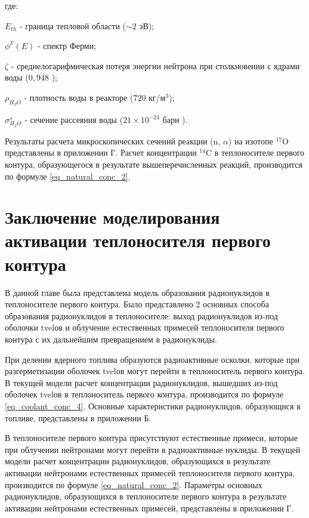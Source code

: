 где:
\begin{description}
    \item $E_{th}$ - граница тепловой области ($\sim 2$ эВ);
    \item $\phi^F(E)$ - спектр Ферми;
    \item $\zeta$ - среднелогарифмическая потеря энергии нейтрона при столкновении с ядрами воды ($0,948$ 
        \cite{savander_part1});
    \item $\rho_{H_2O}$ - плотность воды в реакторе ($720$ кг/м$^{3}$);
    \item $\sigma_{H_2O}^s$ - сечение рассеяния воды ($21 \times 10^{-24}$ барн \cite{janis}).
\end{description}

Результаты расчета микроскопических сечений реакции (n, $\alpha$) на изотопе $^{17}\text{O}$ представлены в приложении 
Г. Расчет концентрации $^{14}\text{C}$ в теплоносителе первого контура, образующегося в результате вышеперечисленных 
реакций, производится по формуле \ref{eq_natural_conc_2}.

\section{Заключение моделирования активации теплоносителя первого контура}

В данной главе была представлена модель образования радионуклидов в теплоносителе первого контура. Было представлено 2 
основных способа образования радионуклидов в теплоносителе: выход радионуклидов из-под оболочки \ac{tvel}ов и облучение 
естественных примесей теплоносителя первого контура с их дальнейшим превращением в радионуклиды.

При делении ядерного топлива образуются радиоактивные осколки, которые при разгерметизации оболочек \ac{tvel}ов могут 
перейти в теплоноситель первого контура. В текущей модели расчет концентрации радионуклидов, вышедших из-под оболочек 
\ac{tvel}ов в теплоноситель первого контура, производится по формуле \ref{eq_coolant_conc_4}. Основные характеристики 
радионуклидов, образующися в топливе, представлены в приложении Б.

В теплоносителе первого контура присутствуют естественные примеси, которые при облучении нейтронами могут перейти в 
радиоактивные нуклиды. В текущей модели расчет концентрации радионуклидов, образующихся в результате активации 
нейтронами естественных примесей теплоносителя первого контура, производится по формуле \ref{eq_natural_conc_2}. 
Параметры основных радионуклидов, образующихся в теплоносителе первого контура в результате активации нейтронами 
естественных примесей, представлены в приложении Г.



